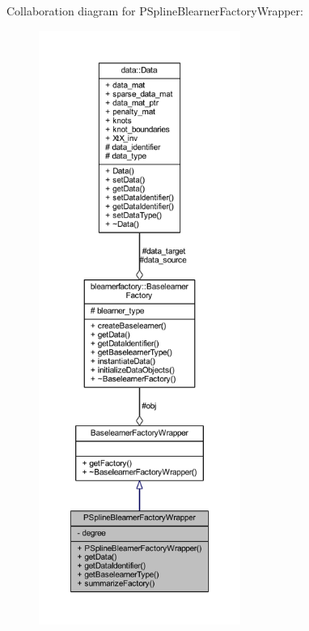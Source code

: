 Collaboration diagram for P\+Spline\+Blearner\+Factory\+Wrapper\+:
\nopagebreak
\begin{figure}[H]
\begin{center}
\leavevmode
\includegraphics[height=550pt]{class_p_spline_blearner_factory_wrapper__coll__graph}
\end{center}
\end{figure}

